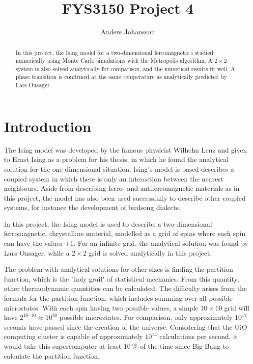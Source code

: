 \documentclass[12pt,english,a4paper]{article}
\title{FYS3150 Project 4}
\author{Anders Johansson}
\begin{document}

\pagestyle{fancy}
\tableofcontents

\begin{abstract}
In this project, the Ising model for a two-dimensional ferromagnetic i studied numerically using Monte Carlo simulations with the Metropolis algorithm. A \(2\times2\) system is also solved analytically for comparison, and the numerical results fit well. A phase transition is confirmed at the same temperature as analytically predicted by Lars Onsager.
\end{abstract}
\clearpage


\section{Introduction}
The Ising model was developed by the famous physicist Wilhelm Lenz and given to Ernst Ising as a problem for his thesis, in which he found the analytical solution for the one-dimensional situation. Ising's model is based describes a coupled system in which there is only an interaction between the nearest neighbours. Aside from describing ferro- and antiferromagnetic materials as in this project, the model has also been used successfully to describe other coupled systems, for instance the development of birdsong dialects\autocite{birdsong}.

In this project, the Ising model is used to describe a two-dimensional ferromagnetic, chrystalline material, modelled as a grid of spins where each spin can have the values \(\pm1\). For an infinite grid, the analytical solution was found by Lars Onsager, while a \(2\times2\) grid is solved analytically in this project.

The problem with analytical solutions for other sizes is finding the partition function, which is the "holy grail" of statistical mechanics. From this quantity, other thermodynamic quantities can be calculated. The difficulty arises from the formula for the partition function, which includes summing over all possible microstates. With each spin having two possible values, a simple \(10\times10\) grid will have \(2^{10\cdot10}\approx10^{30}\) possible microstates. For comparison, only approximately \(10^{17}\) seconds have passed since the creation of the universe. Considering that the UiO computing cluster is capable of approximately \(10^{14}\) calculations per second, it would take this supercomputer at least \(\SI{10}{\percent}\) of the time since Big Bang to calculate the partition function.
\end{document}
